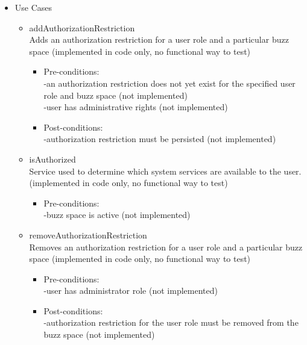 \begin {itemize}
\item Use Cases
\begin {itemize}
\item {addAuthorizationRestriction}\\
Adds an authorization restriction for a user role and a particular buzz space (implemented in code only, no functional way to test)
\begin {itemize}
\item Pre-conditions:\\
-an authorization restriction does not yet exist for the specified user role and buzz space (not implemented)\\
        -user has administrative rights (not implemented)\\

\item Post-conditions:\\
-authorization restriction must be persisted (not implemented)\\
\end {itemize}

\item {isAuthorized}\\
Service used to determine which system services are available to the user. (implemented in code only, no functional way to test)
\begin {itemize}
\item Pre-conditions: \\
-buzz space is active (not implemented)\\ 
\end{itemize}

\item {removeAuthorizationRestriction}\\
Removes an authorization restriction for a user role and a particular buzz space (implemented in code only, no functional way to test)
\begin {itemize}
\item Pre-conditions: \\
-user has administrator role (not implemented)\\
        
\item Post-conditions: \\
  -authorization restriction for the user role must be removed from the buzz space (not implemented)
\end{itemize}
 

\end{itemize}
\end{itemize}
